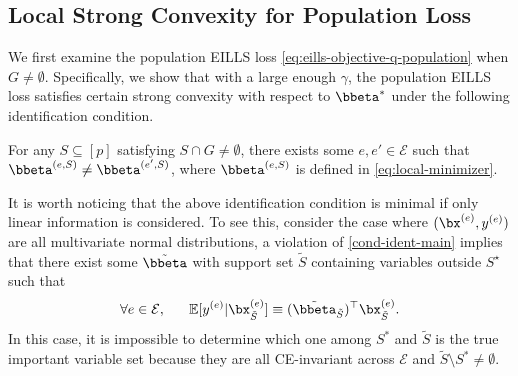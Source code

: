 \documentclass[10pt]{article}
\numberwithin{equation}{section}
\begin{document}
{\subsection{Local Strong Convexity for Population Loss}
\label{subsec:strong-convexity}

We first examine the population EILLS loss \eqref{eq:eills-objective-q-population} when $G\neq \emptyset$. Specifically, we show that with a large enough $\gamma$, the population EILLS loss satisfies certain strong convexity with respect to $\bbeta^*$ under the following identification condition. 


\begin{condition}[Identification]
\label{cond-ident-main}
    For any $S\subseteq [p]$ satisfying $S \cap G \neq \emptyset$, there exists some $e, e'\in \mathcal{E}$ such that $\bbeta^{(e, S)} \neq \bbeta^{(e',S)}$, where $\bbeta^{(e,S)}$ is defined in \eqref{eq:local-minimizer}.
\end{condition} 


\begin{remark}
It is worth noticing that the above identification condition is minimal if only linear information is considered. To see this, consider the case where $(\bx^{(e)}, y^{(e)})$ are all multivariate normal distributions, a violation of \cref{cond-ident-main} implies that there exist some $\tilde{\bbeta}$ with support set $\tilde{S}$ containing variables outside $S^\star$ such that
\begin{align*}
    \forall e\in \mathcal{E}, ~~~~~ \mathbb{E}[y^{(e)}|\bx_{\tilde{S}}^{(e)}] \equiv (\tilde{\bbeta}_{\tilde{S}})^\top \bx_{\tilde{S}}^{(e)}.
\end{align*} 
In this case, it is impossible to determine which one among $S^*$ and $\tilde{S}$ is the true important variable set because they are all CE-invariant across $\mathcal{E}$ and $\tilde{S}\setminus S^*\neq \emptyset$. 
\end{remark}

}
\end{document}
